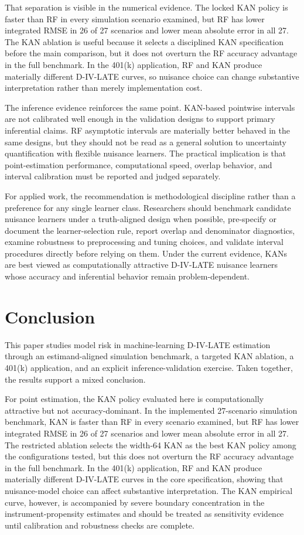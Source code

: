 \documentclass[final,3p,fleqn, 10pt]{elsarticle}
\begin{document}
That separation is visible in the numerical evidence. The locked KAN policy is faster than RF in every simulation scenario examined, but RF has lower integrated RMSE in 26 of 27 scenarios and lower mean absolute error in all 27. The KAN ablation is useful because it selects a disciplined KAN specification before the main comparison, but it does not overturn the RF accuracy advantage in the full benchmark. In the 401(k) application, RF and KAN produce materially different D-IV-LATE curves, so nuisance choice can change substantive interpretation rather than merely implementation cost.

The inference evidence reinforces the same point. KAN-based pointwise intervals are not calibrated well enough in the validation designs to support primary inferential claims. RF asymptotic intervals are materially better behaved in the same designs, but they should not be read as a general solution to uncertainty quantification with flexible nuisance learners. The practical implication is that point-estimation performance, computational speed, overlap behavior, and interval calibration must be reported and judged separately.

For applied work, the recommendation is methodological discipline rather than a preference for any single learner class. Researchers should benchmark candidate nuisance learners under a truth-aligned design when possible, pre-specify or document the learner-selection rule, report overlap and denominator diagnostics, examine robustness to preprocessing and tuning choices, and validate interval procedures directly before relying on them. Under the current evidence, KANs are best viewed as computationally attractive D-IV-LATE nuisance learners whose accuracy and inferential behavior remain problem-dependent.

\section{Conclusion}
\label{sec:conclusion}

This paper studies model risk in machine-learning D-IV-LATE estimation through an estimand-aligned simulation benchmark, a targeted KAN ablation, a 401(k) application, and an explicit inference-validation exercise. Taken together, the results support a mixed conclusion.

For point estimation, the KAN policy evaluated here is computationally attractive but not accuracy-dominant. In the implemented 27-scenario simulation benchmark, KAN is faster than RF in every scenario examined, but RF has lower integrated RMSE in 26 of 27 scenarios and lower mean absolute error in all 27. The restricted ablation selects the width-64 KAN as the best KAN policy among the configurations tested, but this does not overturn the RF accuracy advantage in the full benchmark. In the 401(k) application, RF and KAN produce materially different D-IV-LATE curves in the core specification, showing that nuisance-model choice can affect substantive interpretation. The KAN empirical curve, however, is accompanied by severe boundary concentration in the instrument-propensity estimates and should be treated as sensitivity evidence until calibration and robustness checks are complete.
\end{document}
